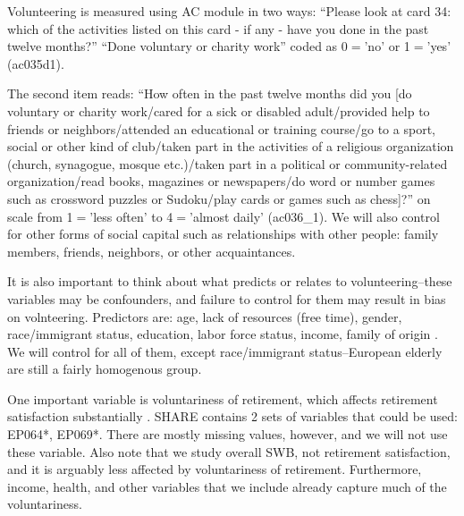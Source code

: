 \documentclass[10pt, letterpaper]{article}
\begin{document}
\begin{spacing}{1.4}
Volunteering is measured using AC module in two ways: ``Please look at card 34: which of the activities listed on this card - if any - have you done in the past twelve
months?'' ``Done voluntary or charity work'' coded as 0$=$'no' or 
1$=$'yes'  (ac035d1). 

The second item reads: ``How often in the past twelve
months did you [do voluntary or charity work/cared for a sick or disabled
adult/provided help to friends or neighbors/attended an educational or training
course/go to a sport, social or other kind of club/taken part in the activities
of a religious organization (church, synagogue, mosque etc.)/taken part in a
political or community-related organization/read books, magazines or
newspapers/do word or number games such as crossword puzzles or Sudoku/play
cards or games such as chess]?'' on scale from 1$=$'less often' to 4$=$'almost
daily' (ac036\_1). We will also control for other  forms of social capital such
as relationships with other people: family members, friends, neighbors, or other acquaintances. %
%
%
%

It is also important to think about what predicts or relates to
volunteering--these variables may be confounders, and failure to control for them may result in bias on
volnteering.  Predictors are: age, lack of resources (free
time), gender, race/immigrant status, education, labor force status, income,
family of origin \citet{wilson12,haski09}. %
 We will control for all of them, except race/immigrant status--European elderly
 are still a fairly homogenous group. 


One important variable is voluntariness of retirement, which
affects retirement satisfaction substantially \citep{bender12}.  SHARE
contains 2 sets of variables that could be used: EP064*, EP069*.
There are mostly missing values, however, and we will not use these variable. Also note that  we study
overall SWB, not retirement satisfaction, and it is arguably less affected by
voluntariness of retirement. Furthermore, income, health, and other variables that we
include already capture much of the voluntariness.



\end{spacing}
\end{document}
